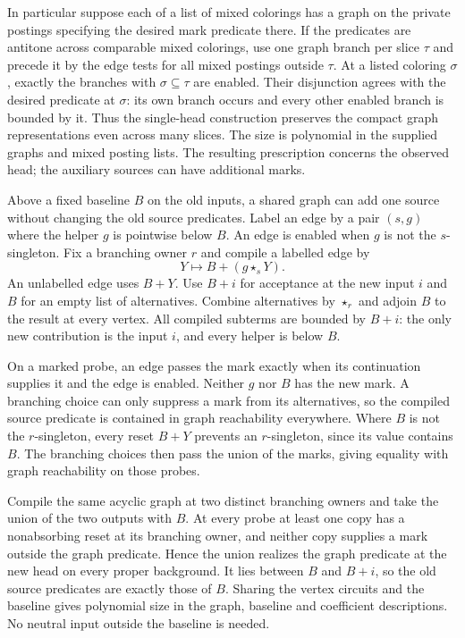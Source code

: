 In particular suppose each of a list of mixed
colorings has a graph on the private postings
specifying the desired mark predicate there.
If the predicates are antitone across comparable
mixed colorings, use one graph branch per slice
$\tau$ and precede it by the edge tests for all
mixed postings outside $\tau$. At a listed
coloring $\sigma$, exactly the branches with
$\sigma\subseteq\tau$ are enabled. Their
disjunction agrees with the desired predicate
at $\sigma$: its own branch occurs and every
other enabled branch is bounded by it. Thus the
single-head construction preserves the compact
graph representations even across many slices.
The size is polynomial in the supplied graphs
and mixed posting lists. The resulting prescription
concerns the observed head; the auxiliary sources
can have additional marks.

Above a fixed baseline $B$ on the old inputs, a
shared graph can add one source without changing
the old source predicates. Label an edge by a pair
$(s,g)$ where the helper $g$ is pointwise below $B$.
An edge is enabled when $g$ is not the $s$-singleton.
Fix a branching owner $r$ and compile a labelled
edge by
\[
                          Y\longmapsto B+(g\star_s Y).
\]
An unlabelled edge uses $B+Y$. Use $B+i$ for
acceptance at the new input $i$ and $B$ for an
empty list of alternatives. Combine alternatives
by $\star_r$ and adjoin $B$ to the result at every
vertex. All compiled subterms are bounded by
$B+i$: the only new contribution is the input
$i$, and every helper is below $B$.

On a marked probe, an edge passes the mark exactly
when its continuation supplies it and the edge
is enabled. Neither $g$ nor $B$ has the new mark.
A branching choice can only suppress a mark from
its alternatives, so the compiled source predicate
is contained in graph reachability everywhere.
Where $B$ is not the $r$-singleton, every reset
$B+Y$ prevents an $r$-singleton, since its value
contains $B$. The branching choices then pass
the union of the marks, giving equality with
graph reachability on those probes.

Compile the same acyclic graph at two distinct
branching owners and take the union of the two
outputs with $B$. At every probe at least one
copy has a nonabsorbing reset at its branching
owner, and neither copy supplies a mark outside
the graph predicate. Hence the union realizes the
graph predicate at the new head on every proper
background. It lies between $B$ and $B+i$, so
the old source predicates are exactly those of
$B$. Sharing the vertex circuits and the baseline
gives polynomial size in the graph, baseline
and coefficient descriptions. No neutral input
outside the baseline is needed.

